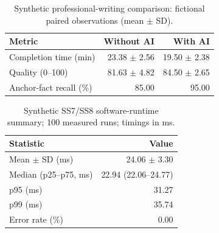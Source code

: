 \begin{table}[htbp]
\centering
\caption{Synthetic professional-writing comparison: fictional paired observations (mean $\pm$ SD).}
\label{tab:ss9:human}
\begin{tabular}{lrr}
\toprule
Metric & Without AI & With AI \\
\midrule
Completion time (min) & 23.38 $\pm$ 2.56 & 19.50 $\pm$ 2.38 \\
Quality (0--100) & 81.63 $\pm$ 4.82 & 84.50 $\pm$ 2.65 \\
Anchor-fact recall (\%) & 85.00 & 95.00 \\
\bottomrule
\end{tabular}
\end{table}

\begin{table}[htbp]
\centering
\caption{Synthetic SS7/SS8 software-runtime summary; 100 measured runs; timings in ms.}
\label{tab:ss9:software}
\begin{tabular}{lr}
\toprule
Statistic & Value \\
\midrule
Mean $\pm$ SD (ms) & 24.06 $\pm$ 3.30 \\
Median (p25--p75, ms) & 22.94 (22.06--24.77) \\
p95 (ms) & 31.27 \\
p99 (ms) & 35.74 \\
Error rate (\%) & 0.00 \\
\bottomrule
\end{tabular}
\end{table}
